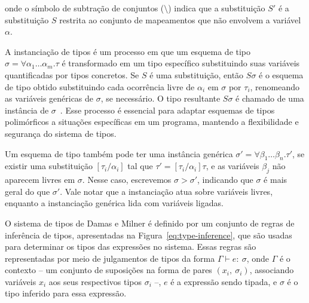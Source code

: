 \noindent onde o símbolo de subtração de conjuntos ($\setminus$) indica que a substituição $S'$ é a substituição $S$ restrita ao conjunto de mapeamentos que não envolvem a variável $\alpha$.

A instanciação de tipos é um processo em que um esquema de tipo $\sigma = \forall \alpha_1 \ldots \alpha_m. \tau$ é transformado em um tipo específico substituindo suas variáveis quantificadas por tipos concretos.
Se $S$ é uma substituição, então $S\sigma$ é o esquema de tipo obtido substituindo cada ocorrência livre de $\alpha_i$ em $\sigma$ por $\tau_i$, renomeando as variáveis genéricas de $\sigma$, se necessário.
O tipo resultante $S\sigma$ é chamado de uma instância de $\sigma$~\cite{damas1982principal}.
Esse processo é essencial para adaptar esquemas de tipos polimórficos a situações específicas em um programa, mantendo a flexibilidade e segurança do sistema de tipos.

Um esquema de tipo também pode ter uma instância genérica $\sigma' = \forall \beta_1 \ldots \beta_n. \tau'$, se existir uma substituição $[ \tau_i / \alpha_i ]$ tal que $\tau' = [\tau_i / \alpha_i]\tau$, e as variáveis $\beta_j$ não aparecem livres em $\sigma$.
Nesse caso, escrevemos $\sigma > \sigma'$, indicando que $\sigma$ é mais geral do que $\sigma'$.
Vale notar que a instanciação atua sobre variáveis livres, enquanto a instanciação genérica lida com variáveis ligadas.

O sistema de tipos de Damas e Milner é definido por um conjunto de regras de inferência de tipos, apresentadas na Figura~\ref{eq:type-inference}, que são usadas para determinar os tipos das expressões no sistema.
Essas regras são representadas por meio de julgamentos de tipos da forma $\Gamma \vdash e{:}\ \sigma$, onde $\Gamma$ é o contexto -- um conjunto de suposições na forma de pares $(x_i,\ \sigma_i)$, associando variáveis $x_i$ aos seus respectivos tipos $\sigma_i$ --, $e$ é a expressão sendo tipada, e $\sigma$ é o tipo inferido para essa expressão.

